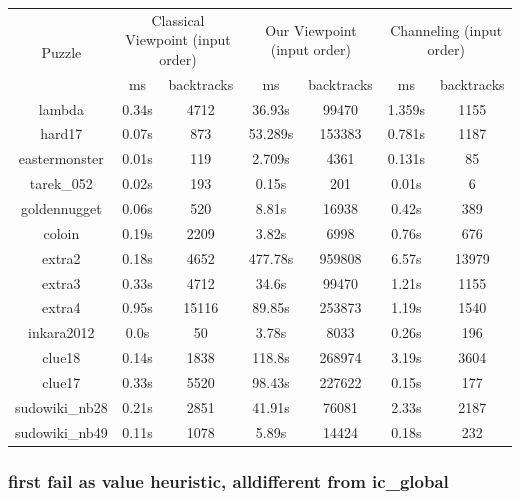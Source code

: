 \documentclass{report}
\begin{document}
\begin{table}[h!]
  \begin{tabular}{|c|c|c|c|c|c|c|}
    \hline
    \multirow{2}{*}{Puzzle} &
      \multicolumn{2}{L|}{Classical Viewpoint (input order)} &
      \multicolumn{2}{L|}{Our Viewpoint (input order)} &
      \multicolumn{2}{L|}{ Channeling (input order)} \\
    & ms & backtracks & ms & backtracks & ms & backtracks \\
    \hline
lambda & 0.34s & 4712 & 36.93s & 99470 & 1.359s & 1155\\
hard17 & 0.07s & 873 & 53.289s & 153383 & 0.781s & 1187\\
eastermonster & 0.01s & 119 & 2.709s & 4361 & 0.131s & 85\\
tarek\_052 & 0.02s & 193 & 0.15s & 201 & 0.01s & 6\\
goldennugget & 0.06s & 520 & 8.81s & 16938 & 0.42s & 389\\
coloin & 0.19s & 2209 & 3.82s & 6998 & 0.76s & 676\\
extra2 & 0.18s & 4652 & 477.78s & 959808 & 6.57s & 13979\\
extra3 & 0.33s & 4712 & 34.6s & 99470 & 1.21s & 1155\\
extra4 & 0.95s & 15116 & 89.85s & 253873 & 1.19s & 1540\\
inkara2012 & 0.0s & 50 & 3.78s & 8033 & 0.26s & 196\\
clue18 & 0.14s & 1838 & 118.8s & 268974 & 3.19s & 3604\\
clue17 & 0.33s & 5520 & 98.43s & 227622 & 0.15s & 177\\
sudowiki\_nb28 & 0.21s & 2851 & 41.91s & 76081 & 2.33s & 2187\\
sudowiki\_nb49 & 0.11s & 1078 & 5.89s & 14424 & 0.18s & 232\\
 \hline
  \end{tabular}
\end{table}

\newpage
\subsubsection{first fail as value heuristic, alldifferent from ic\_global}
\end{document}
